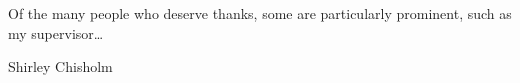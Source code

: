 \begin{acknowledgements}
  Of the many people who deserve thanks, some are particularly prominent,
  such as my supervisor\dots
\end{acknowledgements}




{\tableofcontents \let\cleardoublepage\clearpage \listoffigures \let\cleardoublepage\clearpage \listoftables}

%
  {Shirley Chisholm}
\thispagestyle{empty}
